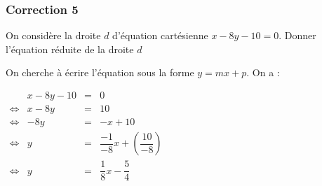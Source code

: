 \documentclass[15pt, mathserif]{beamer}
\begin{document}
\begin{frame}
\vspace{-10mm}
	\frametitle{Correction 5}
On considère la droite $d$ d'équation cartésienne $x-8y-10=0$. Donner l'équation réduite de la droite $d$ 
 
  \bigskip 
 
 On cherche à écrire l'équation sous la forme $y=mx+p$. On a : 
 
 \hfil $\begin{array}{crcl} 
 & x-8y-10&=&0 \\ 
 \Leftrightarrow & x-8y & =&10\\ 
 \Leftrightarrow & -8y &=&-x+10\\ 
 \Leftrightarrow & y &=& \dfrac{-1}{-8}x +\left( \dfrac{10}{-8} \right)\\ 
 \Leftrightarrow & y &=&\dfrac{1}{8}x -\dfrac{5}{4}\end{array}$ 
 
 \end{frame}
\end{document}
